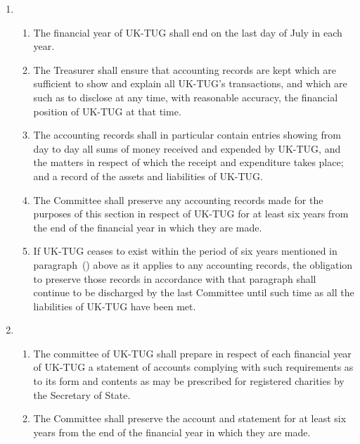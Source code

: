 \documentclass[a4paper,11pt]{article}
\newcounter{refa}
\newcounter{refb}
\begin{document}
\begin{enumerate}

\item
  \begin{enumerate}
  \item The financial year of UK-TUG shall end on the last day of July in each
    year.

  \item The Treasurer shall ensure that accounting records are kept which are
    sufficient to show and explain all UK-TUG's transactions, and which are
    such as to disclose at any time, with reasonable accuracy, the financial
    position of UK-TUG at that time.

  \item The accounting records shall in particular contain entries showing
    from day to day all sums of money received and expended by UK-TUG,
    and the matters in respect of which the receipt and expenditure takes
    place; and a record of the assets and liabilities of UK-TUG.

  \item \setcounter{refa}{\value{enumii}}The Committee shall preserve any
    accounting records made for the purposes of this section in respect of
    UK-TUG for at least six years from the end of the financial year in which
    they are made.

  \item If UK-TUG ceases to exist within the period of six years mentioned in
    paragraph~() above as it applies to any accounting records, the
    obligation to preserve those records in accordance with that paragraph
    shall continue to be discharged by the last Committee until such time as
    all the liabilities of UK-TUG have been met.
  \end{enumerate}

\item
  \begin{enumerate}
  \item The committee of UK-TUG  shall prepare in respect of
    each financial year of UK-TUG a statement of accounts
    complying with such requirements as to its form and
    contents as may be prescribed for registered charities by
    the Secretary of State.

  \item \setcounter{refb}{\value{enumii}}The Committee shall preserve the
    account and statement for at least six years from the end of the financial
    year in which they are made.


\end{enumerate}
\end{enumerate}
\end{document}
